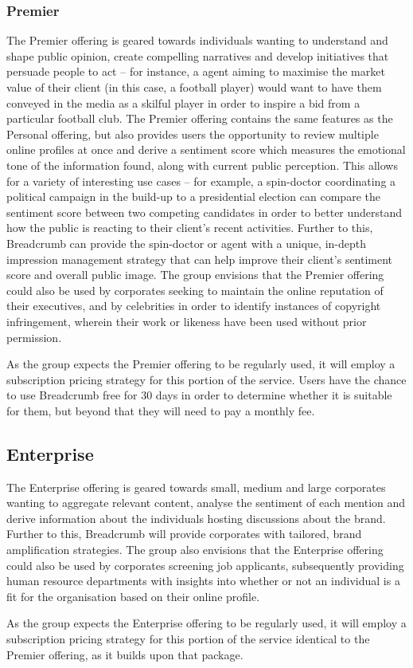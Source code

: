 \subsubsection{Premier}

The Premier offering is geared towards individuals wanting to understand and shape public opinion, create compelling narratives and develop initiatives that persuade people to act -- for instance, a agent aiming to maximise the market value of their client (in this case, a football player) would want to have them conveyed in the media as a skilful player in order to inspire a bid from a particular football club. The Premier offering contains the same features as the Personal offering, but also provides users the opportunity to review multiple online profiles at once and derive a sentiment score which measures the emotional tone of the information found, along with current public perception. This allows for a variety of interesting use cases -- for example, a spin-doctor coordinating a political campaign in the build-up to a presidential election can compare the sentiment score between two competing candidates in order to better understand how the public is reacting to their client’s recent activities. Further to this, Breadcrumb can provide the spin-doctor or agent with a unique, in-depth impression management strategy that can help improve their client’s sentiment score and overall public image. The group envisions that the Premier offering could also be used by corporates seeking to maintain the online reputation of their executives, and by celebrities in order to identify instances of copyright infringement, wherein their work or likeness have been used without prior permission. 

As the group expects the Premier offering to be regularly used, it will employ a subscription pricing strategy for this portion of the service. Users have the chance to use Breadcrumb free for 30 days in order to determine whether it is suitable for them, but beyond that they will need to pay a monthly fee.

\subsection{Enterprise}

The Enterprise offering is geared towards small, medium and large corporates wanting to aggregate relevant content, analyse the sentiment of each mention and derive information about the individuals hosting discussions about the brand. Further to this, Breadcrumb will provide corporates with tailored, brand amplification strategies. The group also envisions that the Enterprise offering could also be used by corporates screening job applicants, subsequently providing human resource departments with insights into whether or not an individual is a fit for the organisation based on their online profile. 

As the group expects the Enterprise offering to be regularly used, it will employ a subscription pricing strategy for this portion of the service identical to the Premier offering, as it builds upon that package.
